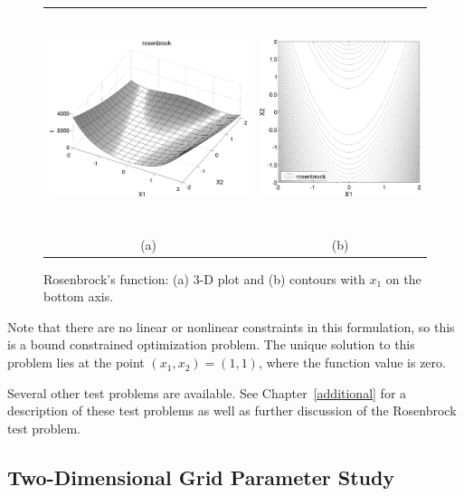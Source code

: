 \begin{figure}[htp!]
  \centering
  \begin{tabular}{cc}
  \includegraphics[height=2.5in]{images/rosen_3d_surf} &
  \includegraphics[height=2.5in]{images/rosen_2d_surf} \\
  (a) & (b) \\
  \end{tabular}
  \caption{Rosenbrock's function: (a) 3-D plot and (b) contours with
  $x_1$ on the bottom axis.}
  \label{tutorial:rosenbrock_prob}
\end{figure}

Note that there are no linear or nonlinear constraints in this
formulation, so this is a bound constrained optimization problem. The
unique solution to this problem lies at the point
$(x_1,x_2) = (1,1)$, where the function value is zero.

Several other test problems are available. See
Chapter~\ref{additional} for a description of these test problems
as well as further discussion of the Rosenbrock test problem.


\subsection{Two-Dimensional Grid Parameter Study}\label{tutorial:examples:param_study}

